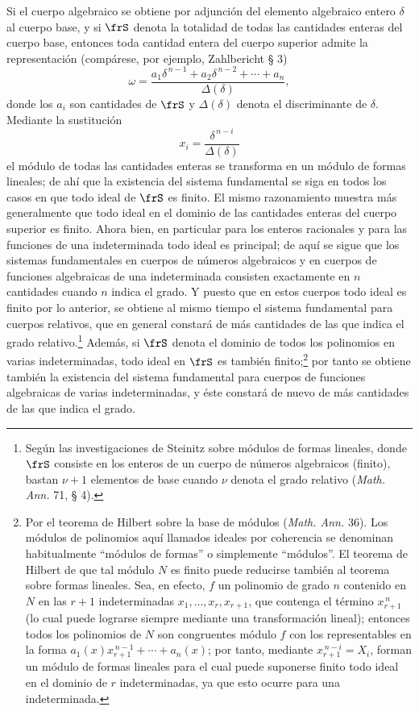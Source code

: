 \documentclass[11pt]{article}
\begin{document}
Si el cuerpo algebraico se obtiene por adjunción del elemento algebraico entero \(\delta\) al cuerpo base, y si \(\frS\) denota la totalidad de todas las cantidades enteras del cuerpo base, entonces toda cantidad entera del cuerpo superior admite la representación (compárese, por ejemplo, Zahlbericht § 3)
\[
\omega=\frac{a_1\delta^{\,n-1}+a_2\delta^{\,n-2}+\cdots+a_n}{\Delta(\delta)},
\]
donde los \(a_i\) son cantidades de \(\frS\) y \(\Delta(\delta)\) denota el discriminante de \(\delta\). Mediante la sustitución
\[
x_i=\frac{\delta^{\,n-i}}{\Delta(\delta)}
\]
el módulo de todas las cantidades enteras se transforma en un módulo de formas lineales; de ahí que la existencia del sistema fundamental se siga en todos los casos en que todo ideal de \(\frS\) es finito. El mismo razonamiento muestra más generalmente que todo ideal en el dominio de las cantidades enteras del cuerpo superior es finito. Ahora bien, en particular para los enteros racionales y para las funciones de una indeterminada todo ideal es principal; de aquí se sigue que los sistemas fundamentales en cuerpos de números algebraicos y en cuerpos de funciones algebraicas de una indeterminada consisten exactamente en \(n\) cantidades cuando \(n\) indica el grado. Y puesto que en estos cuerpos todo ideal es finito por lo anterior, se obtiene al mismo tiempo el sistema fundamental para cuerpos relativos, que en general constará de más cantidades de las que indica el grado relativo.\footnote{Según las investigaciones de Steinitz sobre módulos de formas lineales, donde \(\frS\) consiste en los enteros de un cuerpo de números algebraicos (finito), bastan \(\nu+1\) elementos de base cuando \(\nu\) denota el grado relativo (\emph{Math. Ann.} 71, § 4).} Además, si \(\frS\) denota el dominio de todos los polinomios en varias indeterminadas, todo ideal en \(\frS\) es también finito;\footnote{Por el teorema de Hilbert sobre la base de módulos (\emph{Math. Ann.} 36). Los módulos de polinomios aquí llamados ideales por coherencia se denominan habitualmente ``módulos de formas'' o simplemente ``módulos''. El teorema de Hilbert de que tal módulo \(N\) es finito puede reducirse también al teorema sobre formas lineales. Sea, en efecto, \(f\) un polinomio de grado \(n\) contenido en \(N\) en las \(r+1\) indeterminadas \(x_1,\ldots,x_r,x_{r+1}\), que contenga el término \(x_{r+1}^{\,n}\) (lo cual puede lograrse siempre mediante una transformación lineal); entonces todos los polinomios de \(N\) son congruentes módulo \(f\) con los representables en la forma \(a_1(x)x_{r+1}^{\,n-1}+\cdots+a_n(x)\); por tanto, mediante \(x_{r+1}^{\,n-i}=X_i\), forman un módulo de formas lineales para el cual puede suponerse finito todo ideal en el dominio de \(r\) indeterminadas, ya que esto ocurre para una indeterminada.} por tanto se obtiene también la existencia del sistema fundamental para cuerpos de funciones algebraicas de varias indeterminadas, y éste constará de nuevo de más cantidades de las que indica el grado.
\end{document}
